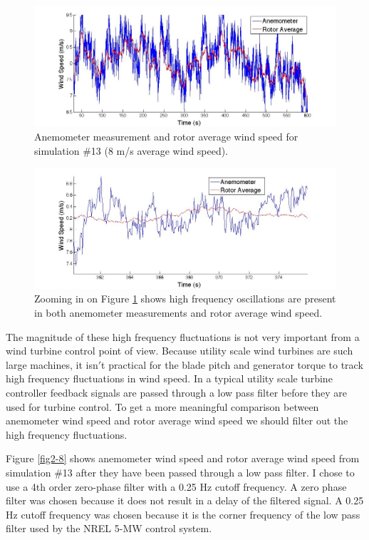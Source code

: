 \begin{figure}[htbp]
	\centering
		\includegraphics[width = \linewidth]{Figures/ch2Figures/fig2-6.jpg}
		
	\caption{Anemometer measurement and rotor average wind speed for simulation \#13 (8 m/s average wind speed).}
	\label{fig2-6}
\end{figure}


\begin{figure}[htbp]
	\centering
		\includegraphics[width = \linewidth]{Figures/ch2Figures/fig2-7.jpg}
	\caption{Zooming in on Figure \ref{fig2-6} shows high frequency oscillations are present in both anemometer measurements and rotor average wind speed.}
	\label{fig2-7}
\end{figure}

The magnitude of these high frequency fluctuations is not very important from a wind turbine control point of view. Because utility scale wind turbines are such large machines, it isn$'$t practical for the blade pitch and generator torque to track high frequency fluctuations in wind speed. In a typical utility scale turbine controller feedback signals are passed through a low pass filter before they are used for turbine control. To get a more meaningful comparison between anemometer wind speed and rotor average wind speed we should filter out the high frequency fluctuations.

Figure \ref{fig2-8} shows anemometer wind speed and rotor average wind speed from simulation \#13 after they have been passed through a low pass filter. I chose to use a 4th order zero-phase filter with a 0.25 Hz cutoff frequency. A zero phase filter was chosen because it does not result in a delay of the filtered signal. A 0.25 Hz cutoff frequency was chosen because it is the corner frequency of the low pass filter used by the NREL 5-MW control system. 

